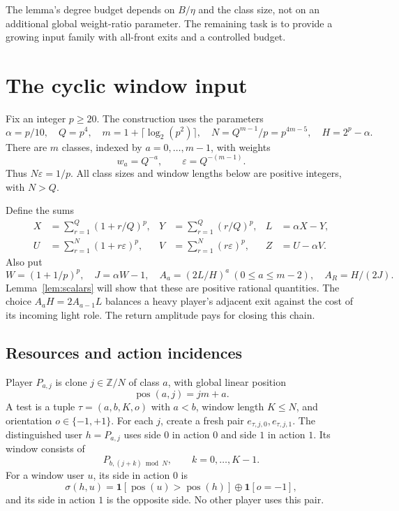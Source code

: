 \documentclass[11pt]{article}
\theoremstyle{definition}
\theoremstyle{remark}
\newcommand{\ind}{\mathbf 1}
\newcommand{\xor}{\mathbin{\oplus}}
\begin{document}
The lemma's degree budget depends on $B/\eta$ and the class size, not on an additional global weight-ratio parameter. The remaining task is to provide a growing input family with all-front exits and a controlled budget.

\section{The cyclic window input}\label{sec:construction}
Fix an integer $p\ge20$. The construction uses the parameters
\begin{equation}\label{eq:parameters}
 \alpha=p/10,\quad Q=p^4,\quad
 m=1+\lceil\log_2(p^2)\rceil,\quad
 N=Q^{m-1}/p=p^{4m-5},\quad H=2^p-\alpha.
\end{equation}
There are $m$ classes, indexed by $a=0,\ldots,m-1$, with weights
\[
 w_a=Q^{-a},\qquad \varepsilon=Q^{-(m-1)}.
\]
Thus $N\varepsilon=1/p$. All class sizes and window lengths below are positive integers, with $N>Q$.

Define the sums
\begin{align}
 X&=\sum_{r=1}^Q(1+r/Q)^p,&Y&=\sum_{r=1}^Q(r/Q)^p,&L&=\alpha X-Y,\label{eq:XY}\\
 U&=\sum_{r=1}^N(1+r\varepsilon)^p,&V&=\sum_{r=1}^N(r\varepsilon)^p,&Z&=U-\alpha V.\label{eq:UV}
\end{align}
Also put
\begin{equation}\label{eq:amplitudes}
 W=(1+1/p)^p,\quad J=\alpha W-1,\quad
 A_a=(2L/H)^a\ (0\le a\le m-2),\quad A_R=H/(2J).
\end{equation}
Lemma~\ref{lem:scalars} will show that these are positive rational quantities. The choice $A_aH=2A_{a-1}L$ balances a heavy player's adjacent exit against the cost of its incoming light role. The return amplitude pays for closing this chain.

\subsection{Resources and action incidences}
Player $P_{a,j}$ is clone $j\in\mathbb Z/N$ of class $a$, with global linear position
\[
 \operatorname{pos}(a,j)=jm+a.
\]
A test is a tuple $\tau=(a,b,K,o)$ with $a<b$, window length $K\le N$, and orientation $o\in\{-1,+1\}$. For each $j$, create a fresh pair $e_{\tau,j,0},e_{\tau,j,1}$. The distinguished user $h=P_{a,j}$ uses side $0$ in action $0$ and side $1$ in action $1$. Its window consists of
\[
 P_{b,(j+k)\bmod N},\qquad k=0,\ldots,K-1.
\]
For a window user $u$, its side in action $0$ is
\begin{equation}\label{eq:incidence}
 \sigma(h,u)=\ind[\operatorname{pos}(u)>\operatorname{pos}(h)]
                 \xor\ind[o=-1],
\end{equation}
and its side in action $1$ is the opposite side. No other player uses this pair.
\end{document}
